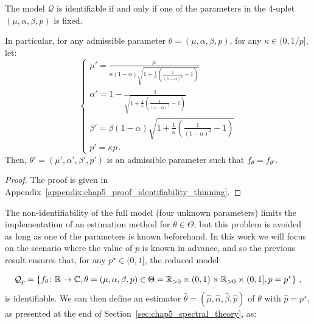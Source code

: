    \begin{proposition}\label{prop:chap5_identifiability_thinning}
        The model $\mathcal{Q}$ is identifiable if and only if one of the parameters in the 4-uplet $(\mu, \alpha, \beta, p)$ is fixed.

        In particular, for any admissible parameter $\theta = (\mu, \alpha, \beta, p)$,
        for any $\kappa\in(0, 1/p]$, let:
        \begin{equation}\label{eq:chap5_nonidentifiable_parameters}
        \begin{cases}
            \mu' = \frac{\mu}{\kappa(1-\alpha)\sqrt{1 + \frac{1}{\kappa}\left(\frac{1}{(1-\alpha)^2} - 1\right)}}\\
            \alpha' = 1 - \frac{1}{\sqrt{1 + \frac{1}{\kappa}\left(\frac{1}{(1-\alpha)^2} - 1\right)}}\\
            \beta' = \beta (1-\alpha) \sqrt{1 + \frac{1}{\kappa}\left(\frac{1}{(1-\alpha)^2} - 1\right)}\\
            p' = \kappa p\,.
          \end{cases}
        \end{equation}
          Then, $\theta' = (\mu', \alpha', \beta', p')$ is an admissible parameter such that $f_{\theta} = f_{\theta'}$.
    \end{proposition}

    \begin{proof}
        The proof is given in Appendix~\ref{appendix:chap5_proof_identifiability_thinning}.
    \end{proof}

    The non-identifiability of the full model (four unknown parameters) limits the implementation of an estimation method for $\theta\in\Theta$, but this problem is avoided as long as one of the parameters is known beforehand. 
    In this work we will focus on the scenario where the value of $p$ is known in advance, 
    and so the previous result ensures that, for any $p^\star\in(0,1]$, the reduced model:
    
    \[\mathcal{Q}_{p} = 
        \left\{
            f_\theta \colon {\mathbb R} \to {\mathbb C}, 
            \theta = (\mu, \alpha, \beta, p) \in \Theta = {\mathbb R}_{>0}\times (0,1) \times {\mathbb R}_{>0}\times(0,1], p=p^\star
        \right\}\,,
    \]
    is identifiable.
    We can then define an estimator $\hat \theta = (\hat \mu, \hat \alpha, \hat \beta, \hat p)$ of $\theta$ with $\hat p = p^\star$, as presented at the end of Section~\ref{sec:chap5_spectral_theory}, as:

